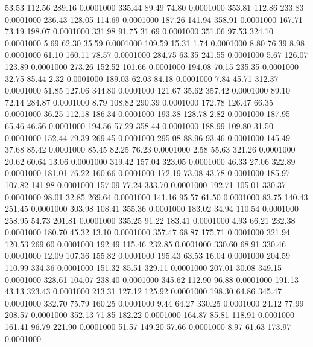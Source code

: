   53.53  112.56  289.16   0.0001000
 335.44   89.49   74.80   0.0001000
 353.81  112.86  233.83   0.0001000
 236.43  128.05  114.69   0.0001000
 187.26  141.94  358.91   0.0001000
 167.71   73.19  198.07   0.0001000
 331.98   91.75   31.69   0.0001000
 351.06   97.53  324.10   0.0001000
   5.69   62.30   35.59   0.0001000
 109.59   15.31    1.74   0.0001000
   8.80   76.39    8.98   0.0001000
  61.10  160.11   78.57   0.0001000
 284.75   63.35  241.55   0.0001000
   5.67  126.07  123.89   0.0001000
 273.26  152.52  101.66   0.0001000
 194.08   70.15  235.35   0.0001000
  32.75   85.44    2.32   0.0001000
 189.03   62.03   84.18   0.0001000
   7.84   45.71  312.37   0.0001000
  51.85  127.06  344.80   0.0001000
 121.67   35.62  357.42   0.0001000
  89.10   72.14  284.87   0.0001000
   8.79  108.82  290.39   0.0001000
 172.78  126.47   66.35   0.0001000
  36.25  112.18  186.34   0.0001000
 193.38  128.78    2.82   0.0001000
 187.95   65.46   46.56   0.0001000
 194.56   57.29  358.44   0.0001000
 188.99  109.80   31.50   0.0001000
 152.44   79.39  269.45   0.0001000
 295.08   88.96   93.46   0.0001000
 145.49   37.68   85.42   0.0001000
  85.45   82.25   76.23   0.0001000
   2.58   55.63  321.26   0.0001000
  20.62   60.64   13.06   0.0001000
 319.42  157.04  323.05   0.0001000
  46.33   27.06  322.89   0.0001000
 181.01   76.22  160.66   0.0001000
 172.19   73.08   43.78   0.0001000
 185.97  107.82  141.98   0.0001000
 157.09   77.24  333.70   0.0001000
 192.71  105.01  330.37   0.0001000
  98.01   32.85  269.64   0.0001000
 141.16   95.57   61.50   0.0001000
  83.75  140.43  251.45   0.0001000
 303.98  108.41  355.36   0.0001000
 183.02   34.94  110.54   0.0001000
 258.95   54.73  201.81   0.0001000
 335.25   91.22  183.41   0.0001000
   4.93   66.21  232.38   0.0001000
 180.70   45.32   13.10   0.0001000
 357.47   68.87  175.71   0.0001000
 321.94  120.53  269.60   0.0001000
 192.49  115.46  232.85   0.0001000
 330.60   68.91  330.46   0.0001000
  12.09  107.36  155.82   0.0001000
 195.43   63.53   16.04   0.0001000
 204.59  110.99  334.36   0.0001000
 151.32   85.51  329.11   0.0001000
 207.01   30.08  349.15   0.0001000
 328.61  104.07  238.40   0.0001000
 345.62  112.90   96.88   0.0001000
 191.13   43.13  323.43   0.0001000
 213.31  127.12  125.92   0.0001000
 198.30   64.86  345.47   0.0001000
 332.70   75.79  160.25   0.0001000
   9.44   64.27  330.25   0.0001000
  24.12   77.99  208.57   0.0001000
 352.13   71.85  182.22   0.0001000
 164.87   85.81  118.91   0.0001000
 161.41   96.79  221.90   0.0001000
  51.57  149.20   57.66   0.0001000
   8.97   61.63  173.97   0.0001000
